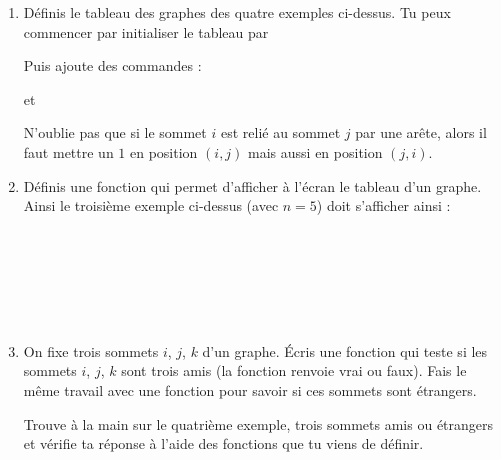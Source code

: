 \documentclass[11pt,class=report,crop=false]{standalone}
\begin{document}
\begin{activite}
\begin{enumerate}
  \item Définis le tableau des graphes des quatre exemples ci-dessus.
  Tu peux commencer par initialiser le tableau par \\
  \centerline{}
  Puis ajoute des commandes :\\
  \centerline{ \quad et \quad {}}
  
  N'oublie pas que si le sommet $i$ est relié au sommet $j$ par une arête, alors il faut mettre un $1$ en position $(i,j)$ mais aussi en position $(j,i)$. 
  
  \item Définis une fonction  qui permet d'afficher à l'écran le tableau d'un graphe.
  Ainsi le troisième exemple ci-dessus (avec $n=5$) doit s'afficher ainsi :
\begin{center}
\\
\\
\\
\\
\\
\end{center}

  \item On fixe trois sommets $i$, $j$, $k$ d'un graphe. Écris une fonction  qui teste si les sommets $i$, $j$, $k$ sont trois amis (la fonction renvoie \og{}vrai\fg{} ou \og{}faux\fg{}). Fais le même travail avec une fonction  pour savoir si ces sommets sont étrangers.
  
Trouve à la main sur le quatrième exemple, trois sommets amis ou étrangers et vérifie ta réponse à l'aide des fonctions que tu viens de définir.

\end{enumerate}   
     
\end{activite}


\end{document}
